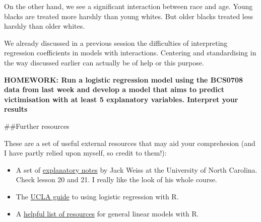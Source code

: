 \documentclass[]{book}
\theoremstyle{definition}
\theoremstyle{definition}
\theoremstyle{definition}
\theoremstyle{remark}
\begin{document}
On the other hand, we see a significant interaction between race and
age. Young blacks are treated more harshly than young whites. But older
blacks treated less harshly than older whites.

We already discussed in a previous session the difficulties of
interpreting regression coefficients in models with interactions.
Centering and standardising in the way discussed earlier can actually be
of help or this purpose.

\textbf{HOMEWORK: Run a logistic regression model using the BCS0708 data
from last week and develop a model that aims to predict victimisation
with at least 5 explanatory variables. Interpret your results}

\#\#Further resources

These are a set of useful external resources that may aid your
comprehesion (and I have partly relied upon myself, so credit to them!):

\begin{itemize}
\item
  A set of
  \href{http://www.unc.edu/courses/2010fall/ecol/563/001/docs/lectures/lecture20.htm\#dealing}{explanatory
  notes} by Jack Weiss at the University of North Carolina. Check lesson
  20 and 21. I really like the look of his whole course.
\item
  The \href{http://www.ats.ucla.edu/stat/r/dae/logit.htm}{UCLA guide} to
  using logistic regression with R.
\item
  A \href{http://www.r-bloggers.com/some-r-resources-for-glms/}{helpful
  list of resources} for general linear models with R.
\end{itemize}


\end{document}
